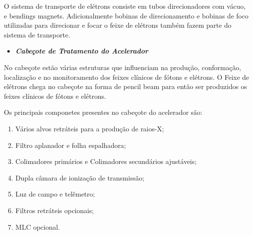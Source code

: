 \documentclass[11pt,a4paper]{article}
\begin{document}
                    O sistema de transporte de elétrons consiste em tubos direcionadores com vácuo, e bendings magnets. Adicionalmente bobinas de direcionamento e bobinas de foco utilizadas para direcionar e focar o feixe de elétrons também fazem parte do sistema de transporte. 

                \begin{itemize}
                    \item \textbf{\textit{\textcolor{CarnationPink}{Cabeçote de Tratamento do Acelerador}}}
                \end{itemize}

                    No cabeçote estão várias estruturas que influenciam na produção, conformação, localização e no monitoramento dos feixes clínicos de fótons e elétrons. O Feixe de elétrons chega no cabeçote na forma de pencil beam para então ser produzidos os feixes clínicos de fótons e elétrons. 

                    Os principais componetes presentes no cabeçote do acelerador são:

                    \begin{enumerate}
                        \item Vários alvos retráteis para a produção de raios-X;
                        \item Filtro aplanador e folha espalhadora;
                        \item Colimadores primários e Colimadores secundários ajustáveis;
                        \item Dupla câmara de ionização de transmissão;
                        \item Luz de campo e telêmetro;
                        \item Filtros retráteis opcionais;
                        \item MLC opcional.
                    \end{enumerate}
\end{document}

